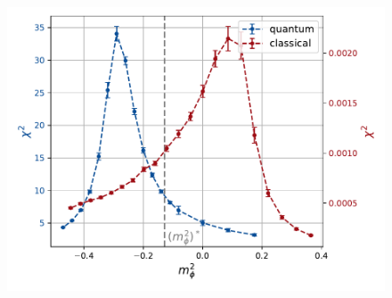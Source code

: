 \begin{figure}
\begin{minipage}{0.45\textwidth}
        \includegraphics[scale=0.5]{figures/chiral_PT/mass_scan/susceptibility.pdf}
    \end{minipage}
\end{figure}

